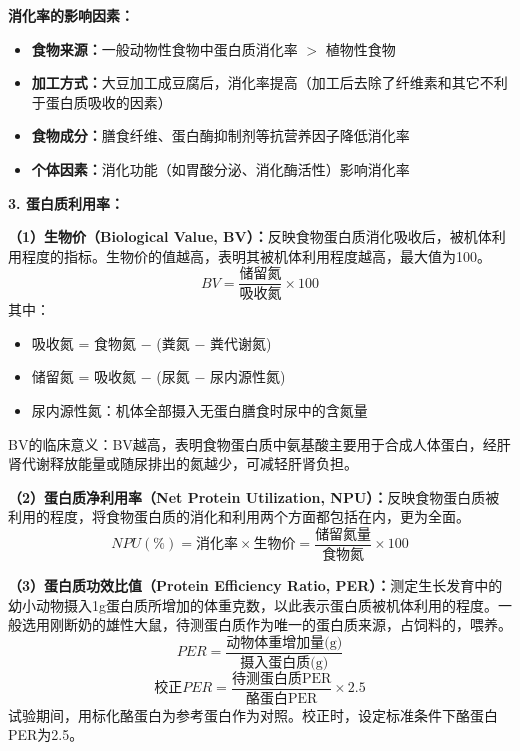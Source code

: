 \begin{tipbox}
\textbf{消化率的影响因素：}
\begin{itemize}[leftmargin=*]
    \item \textbf{食物来源：}一般动物性食物中蛋白质消化率 $>$ 植物性食物
    \item \textbf{加工方式：}大豆加工成豆腐后，消化率提高（加工后去除了纤维素和其它不利于蛋白质吸收的因素）
    \item \textbf{食物成分：}膳食纤维、蛋白酶抑制剂等抗营养因子降低消化率
    \item \textbf{个体因素：}消化功能（如胃酸分泌、消化酶活性）影响消化率
\end{itemize}
\end{tipbox}

\begin{keybox}
\textbf{3. 蛋白质利用率：}

\textbf{（1）生物价（Biological Value, BV）\difficulty：}反映食物蛋白质消化吸收后，被机体利用程度的指标。生物价的值越高，表明其被机体利用程度越高，最大值为100。
\[BV = \frac{\text{储留氮}}{\text{吸收氮}} \times 100\]
其中：
\begin{itemize}[leftmargin=*]
    \item 吸收氮 = 食物氮 $-$ (粪氮 $-$ 粪代谢氮)
    \item 储留氮 = 吸收氮 $-$ (尿氮 $-$ 尿内源性氮)
    \item 尿内源性氮：机体全部摄入无蛋白膳食时尿中的含氮量
\end{itemize}

BV的临床意义：BV越高，表明食物蛋白质中氨基酸主要用于合成人体蛋白，经肝肾代谢释放能量或随尿排出的氮越少，可减轻肝肾负担。 %

\textbf{（2）蛋白质净利用率（Net Protein Utilization, NPU）：}反映食物蛋白质被利用的程度，将食物蛋白质的消化和利用两个方面都包括在内，更为全面。
\[NPU(\%) = \text{消化率} \times \text{生物价} = \frac{\text{储留氮量}}{\text{食物氮}} \times 100\]

\textbf{（3）蛋白质功效比值（Protein Efficiency Ratio, PER）\difficulty：}测定生长发育中的幼小动物摄入1g蛋白质所增加的体重克数，以此表示蛋白质被机体利用的程度。一般选用刚断奶的雄性大鼠，待测蛋白质作为唯一的蛋白质来源，占饲料的，喂养。 %
\[PER = \frac{\text{动物体重增加量(g)}}{\text{摄入蛋白质(g)}}\]
\[校正PER = \frac{\text{待测蛋白质PER}}{\text{酪蛋白PER}} \times 2.5\]
试验期间，用标化酪蛋白为参考蛋白作为对照。校正时，设定标准条件下酪蛋白PER为2.5。


\end{keybox}

